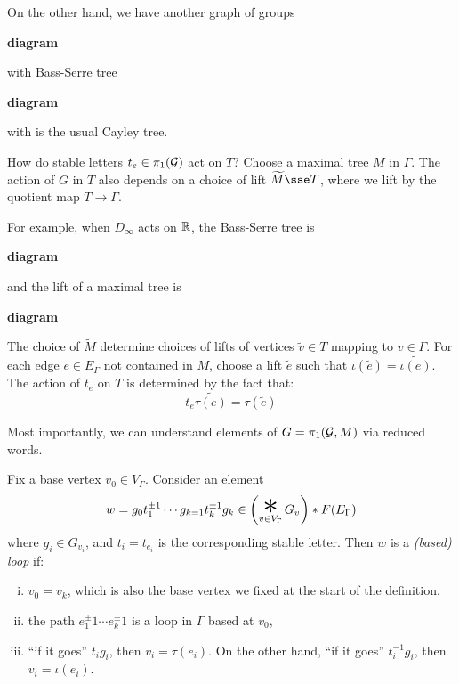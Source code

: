 \documentclass{article}
\renewcommand{\bigstar}{\mathop{\Huge \mathlarger{\mathlarger{*}}}}
\begin{document}
\begin{example}
    On the other hand, we have another graph of groups

    \textbf{diagram}

    with Bass-Serre tree

    \textbf{diagram}

    with is the usual Cayley tree.
\end{example}



\lec

How do stable letters \(t_e \in \pi_1(\mathcal{G})\) act on \(T\)? Choose a maximal tree \(M\) in \(\Gamma\). The action of \(G\) in \(T\) also depends on a choice of lift \(\widetilde M \sse T\), where we lift by the quotient map \(T \to \Gamma\).

For example, when \(D_\infty\) acts on \(\mathbb{R}\), the Bass-Serre tree is

\textbf{diagram}

and the lift of a maximal tree is

\textbf{diagram}

The choice of \(\widetilde M\) determine choices of lifts of vertices \(\widetilde v \in T\) mapping to \(v \in \Gamma\). For each edge \(e \in E_\Gamma\) not contained in \(M\), choose a lift \(\widetilde e\) such that \(\iota(\widetilde e) = \widetilde{\iota(e)}\). The action of \(t_e\) on \(T\) is determined by the fact that:
\[t_e\widetilde{\tau(e)} = \tau(\widetilde e)\]

Most importantly, we can understand elements of \(G = \pi_1(\mathcal{G}, M)\) via reduced words.

\begin{definition}
    [loop]
    Fix a base vertex \(v_0 \in V_\Gamma\). Consider an element
    \[w = g_0t_1^{\pm 1}\cdots g_{k=1}t_k^{\pm 1}g_k \in \left(\bigstar_{v \in V_\Gamma}G_v\right) * F(E_\Gamma)\]
    where \(g_i \in G_{v_i}\), and \(t_i = t_{e_i}\) is the corresponding stable letter. Then \(w\) is a \emph{(based) loop} if:
    \begin{enumerate}[(i)]
        \item \(v_0 = v_k\), which is also the base vertex we fixed at the start of the definition.
        \item the path \(e_1^\pm 1\cdots e_k^\pm 1\) is a loop in \(\Gamma\) based at \(v_0\),
        \item ``if it goes'' \(t_ig_i\), then \(v_i = \tau(e_i)\). On the other hand, ``if it goes'' \(t_i^{-1}g_i\), then \(v_i = \iota(e_i)\).
    \end{enumerate}
\end{definition}
\end{document}
